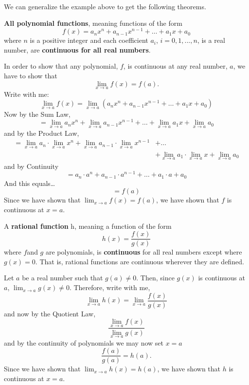 \documentclass{ximera}
\begin{document}
We can generalize the example above to get the following theorems.

\begin{theorem}
 \textbf{All polynomial functions}, meaning functions of the form
  \[
  f(x) = a_nx^n + a_{n-1}x^{n-1} + \dots + a_1 x + a_0
  \]
  where $n$ is a positive integer  and each coefficient $a_i$, $i=0, 1,...,n$, is a real number, are
  \textbf{continuous for all real numbers}.
  \begin{explanation}
  In order to show that any polynomial, $f$, is continuous at any real number, $a$, we have to show that
  \[
  \lim_{x\to a} f(x)=f(a).
  \]
  Write with me:
  \[
  \lim_{x\to a} f(x) = \lim_{x\to a} (a_nx^n + a_{n-1}x^{n-1} + \dots + a_1 x + a_0 )
  \]
  Now by the Sum Law,
  \[
  = \lim_{x\to a} a_nx^n + \lim_{x\to a} a_{n-1}x^{n-1} + \dots +  \lim_{x\to a}a_1 x + \lim_{x\to a} a_0
  \]
  and by the Product Law,
  \begin{align*}
    = \lim_{x\to a} a_n\cdot \lim_{x\to a}x^n + \lim_{x\to a} a_{n-1}\cdot \lim_{x\to a}x^{n-1} &+ \dots\\
    &+  \lim_{x\to a}a_1 \cdot \lim_{x\to a}x + \lim_{x\to a} a_0
  \end{align*}
  and by Continuity
  \[
  = a_n\cdot a^n +  a_{n-1}\cdot a^{n-1} + \dots + a_1 \cdot a + a_0
  \]
  And this equals\dots
  \[
  =f(a)
  \]
  Since we have shown that $\lim_{x\to a} f(x) = f(a)$, we have
  shown that $f$ is continuous at $x=a$.
\end{explanation}
\end{theorem}

\begin{theorem}
   A \textbf{rational function} h, meaning a function of the form 
  \[
  h(x)=\frac{f(x)}{g(x)}
  \]
  where $f $and $g$ are polynomials, is \textbf{continuous} for all real numbers except where $g(x)=0$.  That is,
  rational functions are continuous wherever they are defined.
\begin{explanation}
      Let $a$ be a real number such that $g(a)\neq 0$.  Then, since
      $g(x)$ is continuous at $a$, $\lim_{x\to a} g(x) \neq 0$.
      Therefore, write with me, 
      \[
      \lim_{x \to a} h(x) = \lim_{x\to a} \frac{f(x)}{g(x)}
      \]
      and now by the Quotient Law, 
      \[
      \frac{\lim_{x\to a} f(x)}{ \lim_{x\to a} g(x)}
      \]
      and by the continuity of polynomials we may now set $x=a$
      \[
      \frac{f(a)}{g(a)}=h(a).
      \]
      Since we have shown that $\lim_{x\to a} h(x) = h(a)$, we have
      shown that $h$ is continuous at $x=a$.
\end{explanation}
\end{theorem}
\end{document}
